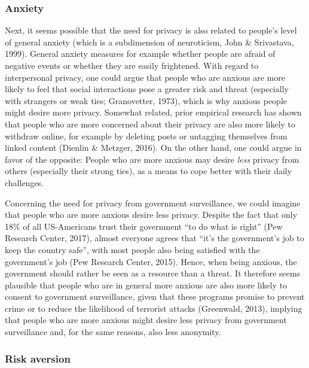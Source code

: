 \documentclass[man,floatsintext]{apa6}
\begin{document}
\hypertarget{anxiety}{%
\subsubsection{Anxiety}\label{anxiety}}

Next, it seems possible that the need for privacy is also related to people's level of general anxiety (which is a subdimension of neuroticism, John \& Srivastava, 1999). General anxiety measures for example whether people are afraid of negative events or whether they are easily frightened. With regard to interpersonal privacy, one could argue that people who are anxious are more likely to feel that social interactions pose a greater risk and threat (especially with strangers or weak ties; Granovetter, 1973), which is why anxious people might desire more privacy. Somewhat related, prior empirical research has shown that people who are more concerned about their privacy are also more likely to withdraw online, for example by deleting posts or untagging themselves from linked content (Dienlin \& Metzger, 2016). On the other hand, one could argue in favor of the opposite: People who are more anxious may desire \emph{less} privacy from others (especially their strong ties), as a means to cope better with their daily challenges.

Concerning the need for privacy from government surveillance, we could imagine that people who are more anxious desire less privacy. Despite the fact that only 18\% of all US-Americans trust their government \enquote{to do what is right} (Pew Research Center, 2017), almost everyone agrees that \enquote{it's the government's job to keep the country safe}, with most people also being satisfied with the government's job (Pew Research Center, 2015). Hence, when being anxious, the government should rather be seen as a resource than a threat. It therefore seems plausible that people who are in general more anxious are also more likely to consent to government surveillance, given that these programs promise to prevent crime or to reduce the likelihood of terrorist attacks (Greenwald, 2013), implying that people who are more anxious might desire less privacy from government surveillance and, for the same reasons, also less anonymity.

\hypertarget{risk-aversion}{%
\subsubsection{Risk aversion}\label{risk-aversion}}
\end{document}

